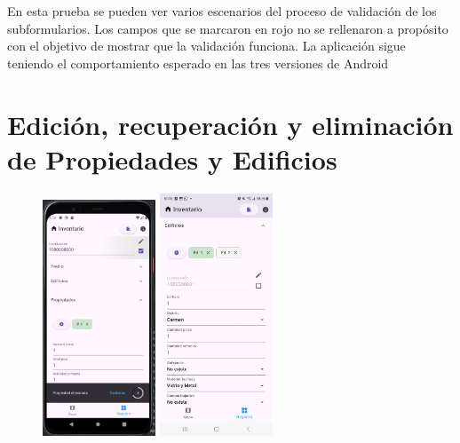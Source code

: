 En esta prueba se pueden ver varios escenarios del proceso de validación de los subformularios. Los campos que se marcaron en rojo no se rellenaron a propósito con el objetivo de mostrar que la
validación funciona. La aplicación sigue teniendo el comportamiento esperado en las tres versiones de Android

\pagebreak
\section{Edición, recuperación y eliminación de Propiedades y Edificios}
\begin{figure}[h]
    \includegraphics[width=0.3\textwidth]{Graphics/Capitulo 4/Pixel 4 [emulador]/4.5/5.png}
    \includegraphics[width=0.3\textwidth]{Graphics/Capitulo 4/Galaxy S23 Ultra Android/4.5/1.jpg}

\end{figure}
